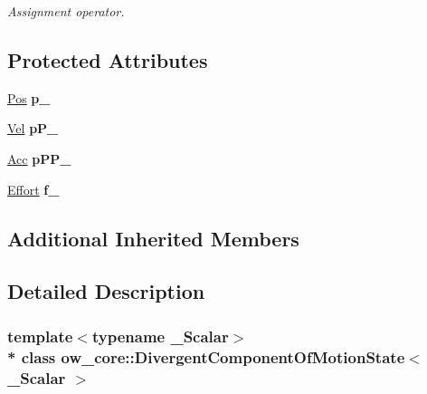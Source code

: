 \begin{DoxyCompactItemize}
\begin{DoxyCompactList}\small\item\em Assignment operator. \end{DoxyCompactList}\end{DoxyCompactItemize}
\subsection*{Protected Attributes}
\begin{DoxyCompactItemize}
\item 
\hyperlink{classow__core_1_1DivergentComponentOfMotion}{Pos} {\bfseries p\+\_\+}\hypertarget{classow__core_1_1DivergentComponentOfMotionState_a909fa38ba48d48aa7b58a166d107f62a}{}\label{classow__core_1_1DivergentComponentOfMotionState_a909fa38ba48d48aa7b58a166d107f62a}

\item 
\hyperlink{classow__core_1_1DivergentComponentOfMotionVelocity}{Vel} {\bfseries p\+P\+\_\+}\hypertarget{classow__core_1_1DivergentComponentOfMotionState_af7ebc00b916a01329339a1fb90f8017c}{}\label{classow__core_1_1DivergentComponentOfMotionState_af7ebc00b916a01329339a1fb90f8017c}

\item 
\hyperlink{classow__core_1_1DivergentComponentOfMotionAcceleration}{Acc} {\bfseries p\+P\+P\+\_\+}\hypertarget{classow__core_1_1DivergentComponentOfMotionState_ac6f5f81a32d15c039b3cbdae0a0993cc}{}\label{classow__core_1_1DivergentComponentOfMotionState_ac6f5f81a32d15c039b3cbdae0a0993cc}

\item 
\hyperlink{classow__core_1_1Force}{Effort} {\bfseries f\+\_\+}\hypertarget{classow__core_1_1DivergentComponentOfMotionState_a024345a603aa1b89fd0c6ecb830d339f}{}\label{classow__core_1_1DivergentComponentOfMotionState_a024345a603aa1b89fd0c6ecb830d339f}

\end{DoxyCompactItemize}
\subsection*{Additional Inherited Members}


\subsection{Detailed Description}
\subsubsection*{template$<$typename \+\_\+\+Scalar$>$\\*
class ow\+\_\+core\+::\+Divergent\+Component\+Of\+Motion\+State$<$ \+\_\+\+Scalar $>$}

